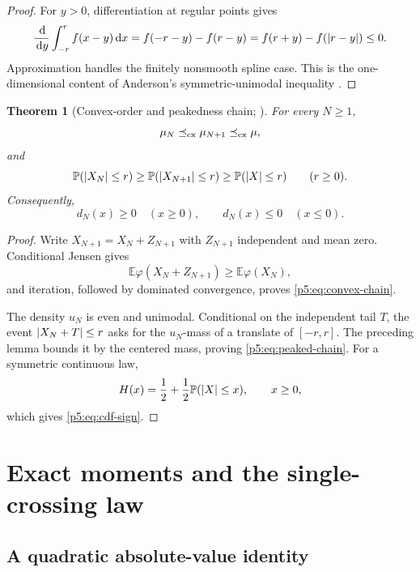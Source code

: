 \documentclass[11pt,oneside]{article}
\numberwithin{equation}{section}
\newtheorem{theorem}{Theorem}[section]
\theoremstyle{definition}
\theoremstyle{remark}
\newcommand{\E}{\mathbb E}
\newcommand{\Prob}{\mathbb P}
\newcommand{\dd}{\,\mathrm d}
\begin{document}
\begin{proof}
For $y>0$, differentiation at regular points gives
\[
 \frac{\dd}{\dd y}\int_{-r}^{r}f(x-y)\dd x
 =f(-r-y)-f(r-y)=f(r+y)-f(\abs{r-y})\le0.
\]
Approximation handles the finitely nonsmooth spline case.  This is the one-dimensional content of Anderson's symmetric-unimodal inequality \cite{p5:Anderson1955}.
\end{proof}

\begin{theorem}[Convex-order and peakedness chain; \newresult]
For every $N\ge1$,
\begin{equation}
 \mu_N\preceq_{\rm cx}\mu_{N+1}\preceq_{\rm cx}\mu,
 \label{p5:eq:convex-chain}
\end{equation}
and
\begin{equation}
 \Prob(\abs{X_N}\le r)
 \ge\Prob(\abs{X_{N+1}}\le r)
 \ge\Prob(\abs X\le r)
 \qquad(r\ge0).
 \label{p5:eq:peaked-chain}
\end{equation}
Consequently,
\begin{equation}
 d_N(x)\ge0\quad(x\ge0),
 \qquad
 d_N(x)\le0\quad(x\le0).
 \label{p5:eq:cdf-sign}
\end{equation}
\end{theorem}

\begin{proof}
Write $X_{N+1}=X_N+Z_{N+1}$ with $Z_{N+1}$ independent and mean zero.  Conditional Jensen gives
\[
 \E\varphi(X_N+Z_{N+1})\ge\E\varphi(X_N),
\]
and iteration, followed by dominated convergence, proves \eqref{p5:eq:convex-chain}.

The density $u_N$ is even and unimodal.  Conditional on the independent tail $T$, the event $\left\lvert X_N+T\right\rvert\le r$ asks for the $u_N$-mass of a translate of $[-r,r]$.  The preceding lemma bounds it by the centered mass, proving \eqref{p5:eq:peaked-chain}.  For a symmetric continuous law,
\[
 H(x)=\frac12+\frac12\Prob(\abs X\le x),\qquad x\ge0,
\]
which gives \eqref{p5:eq:cdf-sign}.
\end{proof}

\section{Exact moments and the single-crossing law}
\label{p5:sec:crossing}

\subsection{A quadratic absolute-value identity}
\end{document}
